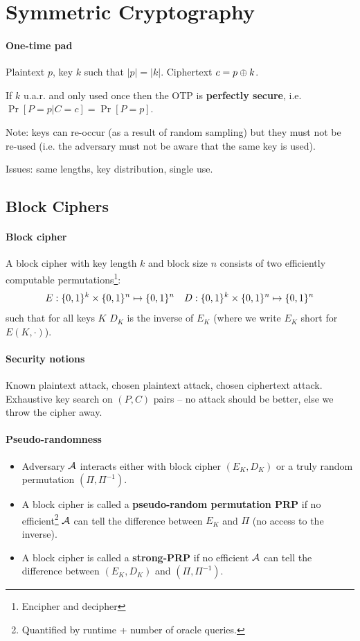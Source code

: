 
\section{Symmetric Cryptography}

\paragraph{One-time pad}
Plaintext $p$, key $k$ such that $|p| = |k|$.
Ciphertext $c = p \oplus k$.

If $k$ u.a.r. and only used once then the OTP is \textbf{perfectly secure}, i.e.
$ \Pr[P=p|C=c] = \Pr[P=p]$.

Note: keys can re-occur (as a result of random sampling) but they must not be re-used (i.e. the adversary must not be aware that the same key is used).

Issues: same lengths, key distribution, single use.

\subsection{Block Ciphers}

\paragraph{Block cipher}
A block cipher with key length $k$ and block size $n$ consists of two efficiently computable permutations\footnote{Encipher and decipher}:
$$ E: \lbrace 0, 1 \rbrace^k \times \lbrace 0, 1 \rbrace^n \mapsto \lbrace 0, 1 \rbrace^n \quad
D: \lbrace 0, 1 \rbrace^k \times \lbrace 0, 1 \rbrace^n \mapsto \lbrace 0, 1 \rbrace^n $$
such that for all keys $K$ $D_K$ is the inverse of $E_K$
(where we write $E_K$ short for $E(K, \cdot)$).

\paragraph{Security notions}
Known plaintext attack, chosen plaintext attack, chosen ciphertext attack.
Exhaustive key search on $(P,C)$ pairs -- no attack should be better, else we throw the cipher away.

\paragraph{Pseudo-randomness}
\begin{itemize}
\item Adversary $\mathcal{A}$ interacts either with block cipher $(E_K, D_K)$ or a truly random permutation $(\Pi, \Pi^{-1})$.
\item A block cipher is called a \textbf{pseudo-random permutation PRP} if no efficient\footnote{Quantified by runtime + number of oracle queries.} $\mathcal{A}$ can tell the difference between $E_K$ and $\Pi$ (no access to the inverse).
\item A block cipher is called a \textbf{strong-PRP} if no efficient $\mathcal{A}$ can tell the difference between $(E_K, D_K)$ and $(\Pi, \Pi^{-1})$.
\end{itemize}


